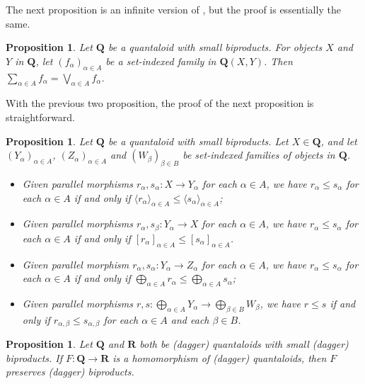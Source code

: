 \documentclass[12pt]{tac}
\newtheorem{proposition}[theorem]{Proposition}
\theoremstyle{definition}
\theoremstyle{remark}
\newcommand{\<}{\langle}
\renewcommand{\>}{\rangle}
\renewcommand{\:}{\colon}
\begin{document}
The next proposition is an infinite version of \cite[Lemma 2.21]{heunenvicary}, but the proof is essentially the same.
\begin{proposition}\label{prop:sums are suprema in quantaloids with biproducts}
     Let $\mathbf Q$ be a quantaloid with small biproducts. For objects $X$ and $Y$ in $\mathbf Q$, let $(f_\alpha)_{\alpha\in A}$ be  a set-indexed family in $\mathbf Q(X,Y)$. Then $\sum_{\alpha\in A}f_\alpha=\bigvee_{\alpha\in A}f_\alpha$.
\end{proposition}
 
With the previous two proposition, the proof of the next proposition is straightforward.
\begin{proposition}\label{prop:biproducts in quantaloids are monotone}
    Let $\mathbf Q$ be a quantaloid with small biproducts. Let $X\in\mathbf Q$, and let $(Y_\alpha)_{\alpha\in A}$, $(Z_\alpha)_{\alpha\in A}$ and $(W_\beta)_{\beta\in B}$ be set-indexed families of objects in $\mathbf Q$.
    \begin{itemize}
              \item[(a)] Given parallel morphisms $r_\alpha,s_\alpha:X\to Y_\alpha$ for each $\alpha\in A$, we have $r_\alpha\leq s_\alpha$ for each $\alpha\in A$ if and only if $\langle r_\alpha\rangle_{\alpha\in A}\leq \langle s_\alpha\rangle_{\alpha\in A}$;
        \item[(b)] Given parallel morphisms $r_\alpha,s_\beta:Y_\alpha\to X$ for each $\alpha\in A$, we have $r_\alpha\leq s_\alpha$ for each $\alpha\in A$ if and only if $[r_\alpha]_{\alpha\in A}\leq[s_\alpha]_{\alpha\in A}$.
         \item[(c)] Given parallel morphism $r_\alpha,s_\alpha:Y_\alpha\to Z_\alpha$ for each $\alpha\in A$, we have $r_\alpha\leq s_\alpha$ for each $\alpha\in A$ if and only if $\bigoplus_{\alpha\in A}r_\alpha\leq\bigoplus_{\alpha\in A}s_\alpha$;
         \item[(d)] Given parallel morphisms $r,s:\bigoplus_{\alpha\in A}Y_\alpha\to\bigoplus_{\beta\in B}W_\beta$, we have $r\leq s$ if and only if $r_{\alpha,\beta}\leq s_{\alpha,\beta}$ for each $\alpha\in A$ and each $\beta\in B$.
         \end{itemize}
     \end{proposition}



\begin{proposition}\label{prop:quantaloid homomorphisms preserve biproducts}
    Let $\mathbf Q$ and $\mathbf R$ both be (dagger) quantaloids with small (dagger) biproducts. If $F:\mathbf Q\to\mathbf R$ is a homomorphism of (dagger) quantaloids, then $F$ preserves (dagger) biproducts. 
\end{proposition}
\end{document}

